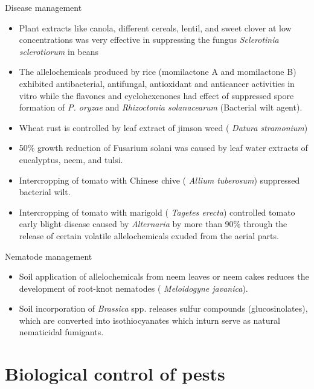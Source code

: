 \documentclass[11pt,dvipsnames,ignorenonframetext,aspectratio=169]{beamer}
\providecommand{\tightlist}{%
  \setlength{\itemsep}{0pt}\setlength{\parskip}{0pt}}
\begin{document}
\begin{frame}{Disease management}
\protect\hypertarget{disease-management}{}
\small

\begin{itemize}
\tightlist
\item
  Plant extracts like canola, different cereals, lentil, and sweet
  clover at low concentrations was very effective in suppressing the
  fungus \emph{Sclerotinia sclerotiorum} in beans
\item
  The allelochemicals produced by rice (momilactone A and momilactone B)
  exhibited antibacterial, antifungal, antioxidant and anticancer
  activities in vitro while the flavones and cyclohexenones had effect
  of suppressed spore formation of \textit{P. oryzae} and
  \textit{Rhizoctonia solanacearum} (Bacterial wilt agent).
\item
  Wheat rust is controlled by leaf extract of jimson weed ( \emph{Datura
  stramonium})
\item
  50\% growth reduction of Fusarium solani was caused by leaf water
  extracts of eucalyptus, neem, and tulsi.
\item
  Intercropping of tomato with Chinese chive ( \emph{Allium tuberosum})
  suppressed bacterial wilt.
\item
  Intercropping of tomato with marigold ( \emph{Tagetes erecta})
  controlled tomato early blight disease caused by \emph{Alternaria} by
  more than 90\% through the release of certain volatile allelochemicals
  exuded from the aerial parts.
\end{itemize}
\end{frame}

\begin{frame}{Nematode management}
\protect\hypertarget{nematode-management}{}
\begin{itemize}
\tightlist
\item
  Soil application of allelochemicals from neem leaves or neem cakes
  reduces the development of root-knot nematodes ( \emph{Meloidogyne
  javanica}).
\item
  Soil incorporation of \emph{Brassica} spp. releases sulfur compounds
  (glucosinolates), which are converted into isothiocyanates which
  inturn serve as natural nematicidal fumigants.
\end{itemize}
\end{frame}

\hypertarget{biological-control-of-pests}{%
\section{Biological control of
pests}\label{biological-control-of-pests}}
\end{document}
